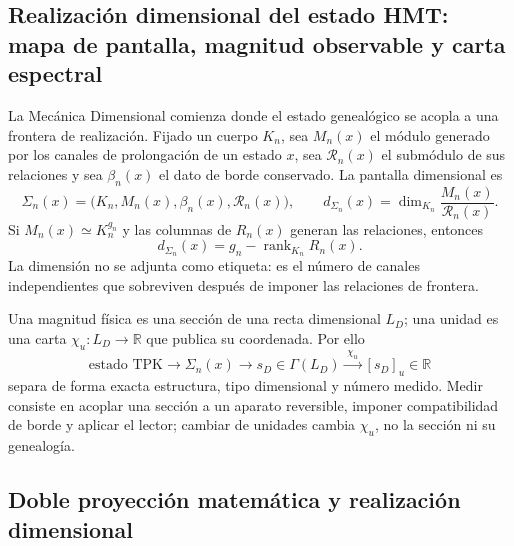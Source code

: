 {\subsection{Realización dimensional del estado HMT: mapa de pantalla, magnitud observable y carta espectral}

La Mecánica Dimensional comienza donde el estado genealógico se acopla a una
frontera de realización. Fijado un cuerpo \(K_n\), sea \(M_n(x)\) el módulo
generado por los canales de prolongación de un estado \(x\), sea
\(\mathcal R_n(x)\) el submódulo de sus relaciones y sea \(\beta_n(x)\) el
dato de borde conservado. La pantalla dimensional es
\begin{equation}
\Sigma_n(x)=\bigl(K_n,M_n(x),\beta_n(x),\mathcal R_n(x)\bigr),
\qquad
d_{\Sigma_n}(x)=\dim_{K_n}\frac{M_n(x)}{\mathcal R_n(x)}.
\label{p12-83-c3-s1:eq:md-screen}
\end{equation}
Si \(M_n(x)\simeq K_n^{g_n}\) y las columnas de \(R_n(x)\) generan las
relaciones, entonces
\begin{equation}
\boxed{d_{\Sigma_n}(x)=g_n-\operatorname{rank}_{K_n}R_n(x).}
\label{p12-83-c3-s1:eq:md-rank}
\end{equation}
La dimensión no se adjunta como etiqueta: es el número de canales
independientes que sobreviven después de imponer las relaciones de frontera.

Una magnitud física es una sección de una recta dimensional \(L_D\); una
unidad es una carta \(\chi_u:L_D\to\mathbb R\) que publica su coordenada.
Por ello
\begin{equation}
\text{estado TPK}\longrightarrow\Sigma_n(x)
\longrightarrow s_D\in\Gamma(L_D)
\xrightarrow{\;\chi_u\;}[s_D]_u\in\mathbb R
\label{p12-83-c3-s1:eq:md-measurement-chain}
\end{equation}
separa de forma exacta estructura, tipo dimensional y número medido. Medir
consiste en acoplar una sección a un aparato reversible, imponer
compatibilidad de borde y aplicar el lector; cambiar de unidades cambia
\(\chi_u\), no la sección ni su genealogía.

\subsection{Doble proyección matemática y realización dimensional}

}
